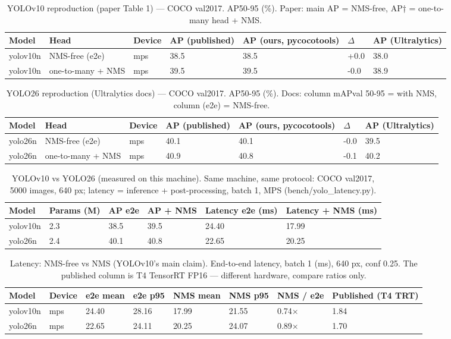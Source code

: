 \begin{table}[ht]
\centering
\small
\caption{YOLOv10 reproduction (paper Table 1) — COCO val2017. AP50-95 (\%). Paper: main AP = NMS-free, AP† = one-to-many head + NMS.}
\begin{tabular}{lllllll}
\toprule
Model & Head & Device & AP (published) & AP (ours, pycocotools) & $\Delta$ & AP (Ultralytics) \\
\midrule
yolov10n & NMS-free (e2e) & mps & 38.5 & 38.5 & +0.0 & 38.0 \\
yolov10n & one-to-many + NMS & mps & 39.5 & 39.5 & -0.0 & 38.9 \\
\bottomrule
\end{tabular}
\end{table}

\begin{table}[ht]
\centering
\small
\caption{YOLO26 reproduction (Ultralytics docs) — COCO val2017. AP50-95 (\%). Docs: column mAPval 50-95 = with NMS, column (e2e) = NMS-free.}
\begin{tabular}{lllllll}
\toprule
Model & Head & Device & AP (published) & AP (ours, pycocotools) & $\Delta$ & AP (Ultralytics) \\
\midrule
yolo26n & NMS-free (e2e) & mps & 40.1 & 40.1 & -0.0 & 39.5 \\
yolo26n & one-to-many + NMS & mps & 40.9 & 40.8 & -0.1 & 40.2 \\
\bottomrule
\end{tabular}
\end{table}

\begin{table}[ht]
\centering
\small
\caption{YOLOv10 vs YOLO26 (measured on this machine). Same machine, same protocol: COCO val2017, 5000 images, 640 px; latency = inference + post-processing, batch 1, MPS (bench/yolo\_latency.py).}
\begin{tabular}{llllll}
\toprule
Model & Params (M) & AP e2e & AP + NMS & Latency e2e (ms) & Latency + NMS (ms) \\
\midrule
yolov10n & 2.3 & 38.5 & 39.5 & 24.40 & 17.99 \\
yolo26n & 2.4 & 40.1 & 40.8 & 22.65 & 20.25 \\
\bottomrule
\end{tabular}
\end{table}

\begin{table}[ht]
\centering
\small
\caption{Latency: NMS-free vs NMS (YOLOv10's main claim). End-to-end latency, batch 1 (ms), 640 px, conf 0.25. The published column is T4 TensorRT FP16 — different hardware, compare ratios only.}
\begin{tabular}{llllllll}
\toprule
Model & Device & e2e mean & e2e p95 & NMS mean & NMS p95 & NMS / e2e & Published (T4 TRT) \\
\midrule
yolov10n & mps & 24.40 & 28.16 & 17.99 & 21.55 & 0.74$\times$ & 1.84 \\
yolo26n & mps & 22.65 & 24.11 & 20.25 & 24.07 & 0.89$\times$ & 1.70 \\
\bottomrule
\end{tabular}
\end{table}

